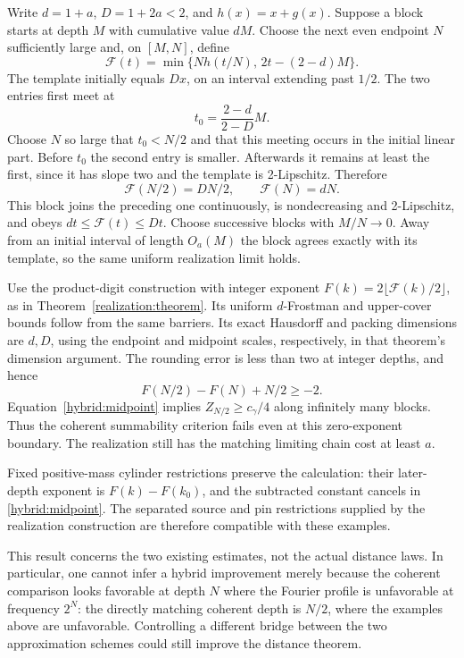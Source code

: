 Write \(d=1+a\), \(D=1+2a<2\), and \(h(x)=x+g(x)\).
Suppose a block starts at depth \(M\) with cumulative value \(dM\).
Choose the next even endpoint \(N\) sufficiently large and, on
\([M,N]\), define
\[
 \mathcal F(t)=
 \min\{Nh(t/N),\,2t-(2-d)M\}.
\]
The template initially equals \(Dx\), on an interval extending past
\(1/2\). The two entries first meet at
\[
 t_0=\frac{2-d}{2-D}M.
\]
Choose \(N\) so large that \(t_0<N/2\) and that this meeting occurs
in the initial linear part. Before \(t_0\) the second entry is smaller.
Afterwards it remains at least the first, since it has slope two
and the template is 2-Lipschitz. Therefore
\[
 \mathcal F(N/2)=DN/2,\qquad \mathcal F(N)=dN.
\]
This block joins the preceding one continuously, is nondecreasing and
2-Lipschitz, and obeys \(dt\le\mathcal F(t)\le Dt\).
Choose successive blocks with \(M/N\to0\). Away from an initial
interval of length \(O_{a}(M)\) the block agrees exactly with its
template, so the same uniform realization limit holds.

Use the product-digit construction with integer exponent
\(F(k)=2\lfloor\mathcal F(k)/2\rfloor\), as in
Theorem~\ref{realization:theorem}. Its uniform \(d\)-Frostman and
upper-cover bounds follow from the same barriers. Its exact Hausdorff
and packing dimensions are \(d,D\), using the endpoint and midpoint
scales, respectively, in that theorem's dimension argument.
The rounding error is less than two at integer depths, and hence
\[
 F(N/2)-F(N)+N/2\ge-2.
\]
Equation~\eqref{hybrid:midpoint} implies
\(Z_{N/2}\ge c_\gamma/4\) along infinitely many blocks. Thus the
coherent summability criterion fails even at this zero-exponent
boundary. The realization still has the matching limiting chain cost
at least \(a\).

Fixed positive-mass cylinder restrictions preserve the calculation:
their later-depth exponent is \(F(k)-F(k_0)\), and the subtracted
constant cancels in \eqref{hybrid:midpoint}. The separated source
and pin restrictions supplied by the realization construction are
therefore compatible with these examples.

This result concerns the two existing estimates, not the actual distance
laws. In particular, one cannot infer a hybrid improvement merely because
the coherent comparison looks favorable at depth \(N\) where the Fourier
profile is unfavorable at frequency \(2^N\): the directly matching
coherent depth is \(N/2\), where the examples above are unfavorable.
Controlling a different bridge between the two approximation schemes
could still improve the distance theorem.
